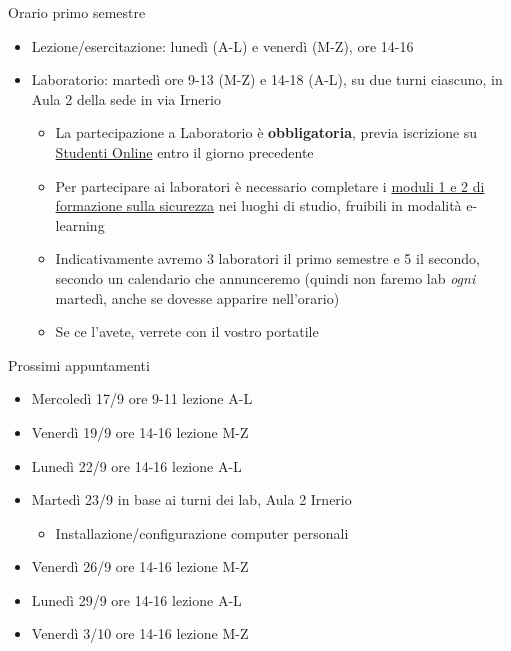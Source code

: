 \begin{frame}{Orario primo semestre}
  \begin{itemize}
  \item Lezione/esercitazione: lunedì (A-L) e venerdì (M-Z), ore 14-16
  \item Laboratorio: martedì ore 9-13 (M-Z) e 14-18 (A-L), su due
    turni ciascuno, in Aula 2 della sede in via Irnerio
    \begin{itemize}
    \item La partecipazione a Laboratorio è \textbf{obbligatoria}, previa
      iscrizione su \href{https://studenti.unibo.it/sol/}{Studenti Online}
      entro il giorno precedente
    \item Per partecipare ai laboratori è necessario completare i
      \href{https://site.unibo.it/tutela-promozione-salute-sicurezza/it/corsi-di-formazione/formazione-obbligatoria-su-sicurezza-e-salute-per-svolgimento-di-tirocinio-tesi-laboratorio}{moduli 1 e 2 di formazione sulla sicurezza}
      nei luoghi di studio, fruibili in modalità e-learning
    \item Indicativamente avremo 3 laboratori il primo semestre e 5 il secondo,
      secondo un calendario che annunceremo (quindi non faremo lab \textit{ogni}
      martedì, anche se dovesse apparire nell'orario)
    \item Se ce l'avete, verrete con il vostro portatile
    \end{itemize}
  \end{itemize}
\end{frame}

\begin{frame}{Prossimi appuntamenti}
  \begin{itemize}

  \item Mercoledì 17/9 ore 9-11 lezione A-L
  \item Venerdì 19/9 ore 14-16 lezione M-Z
  \item Lunedì 22/9 ore 14-16 lezione A-L
  \item Martedì 23/9 in base ai turni dei lab, Aula 2 Irnerio
    \begin{itemize}
    \item Installazione/configurazione computer personali
    \end{itemize}
  \item Venerdì 26/9 ore 14-16 lezione M-Z
  \item Lunedì 29/9 ore 14-16 lezione A-L
  \item Venerdì 3/10 ore 14-16 lezione M-Z
  \end{itemize}
\end{frame}

